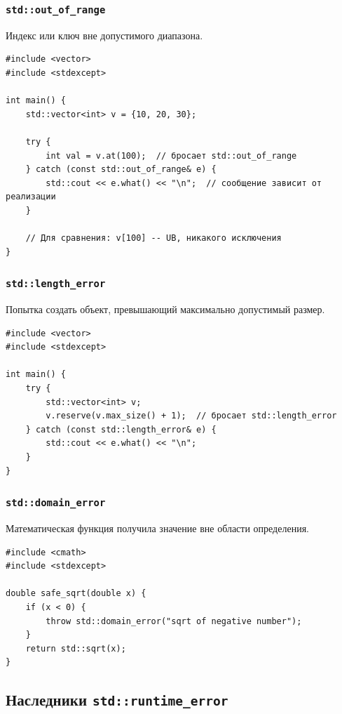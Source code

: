 \documentclass[a4paper,12pt]{article}
\begin{document}
\subsubsection{\texttt{std::out\_of\_range}}

Индекс или ключ вне допустимого диапазона.

\begin{lstlisting}
#include <vector>
#include <stdexcept>

int main() {
    std::vector<int> v = {10, 20, 30};

    try {
        int val = v.at(100);  // бросает std::out_of_range
    } catch (const std::out_of_range& e) {
        std::cout << e.what() << "\n";  // сообщение зависит от реализации
    }

    // Для сравнения: v[100] -- UB, никакого исключения
}
\end{lstlisting}

\subsubsection{\texttt{std::length\_error}}

Попытка создать объект, превышающий максимально допустимый размер.

\begin{lstlisting}
#include <vector>
#include <stdexcept>

int main() {
    try {
        std::vector<int> v;
        v.reserve(v.max_size() + 1);  // бросает std::length_error
    } catch (const std::length_error& e) {
        std::cout << e.what() << "\n";
    }
}
\end{lstlisting}

\subsubsection{\texttt{std::domain\_error}}

Математическая функция получила значение вне области определения.

\begin{lstlisting}
#include <cmath>
#include <stdexcept>

double safe_sqrt(double x) {
    if (x < 0) {
        throw std::domain_error("sqrt of negative number");
    }
    return std::sqrt(x);
}
\end{lstlisting}

\subsection{Наследники \texttt{std::runtime\_error}}
\end{document}
